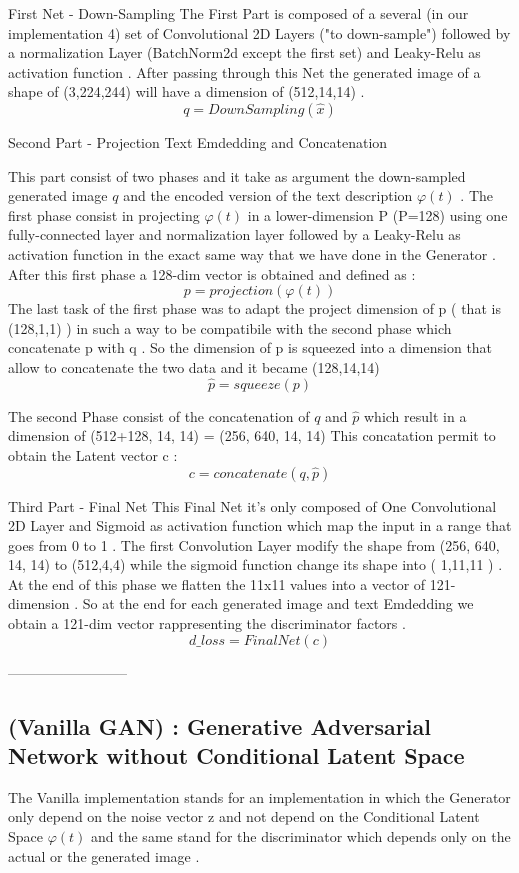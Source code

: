 First Net - Down-Sampling 
The First Part is composed of a several (in our implementation 4) set 
of Convolutional 2D Layers ("to down-sample") 
followed by a normalization Layer (BatchNorm2d except the first set)
and Leaky-Relu as activation function . 
After passing through this Net the generated image of a shape of (3,224,244)
will have a dimension of (512,14,14) .
\[
 q = DownSampling( \hat{x} )
\]

Second Part - Projection Text Emdedding and Concatenation

This part consist of two phases and it take as argument the down-sampled generated 
image ${q}$ and the encoded version of the text description $\varphi(t)$ .
The first phase consist in projecting $\varphi(t)$
in a lower-dimension P (P=128) using one fully-connected layer and normalization layer 
followed by a Leaky-Relu as activation function in the exact same way that we have done in 
the Generator .
After this first phase a 128-dim vector is obtained and defined as :
\[
 p = projection( \varphi(t) )
\]
The last task of the first phase was to adapt the project dimension of p 
( that is (128,1,1) ) in such a way to be compatibile with the second phase 
which concatenate p with q . 
So the dimension of p is squeezed into a dimension that allow to concatenate
the two data and it became (128,14,14)
\[
 \hat{p} = squeeze( p )
\]

The second Phase consist of the concatenation of $q$ and $\hat{p}$ 
which result in a dimension of (512+128, 14, 14) = (256, 640, 14, 14)
This concatation permit to obtain the Latent vector c :
\[
 c = concatenate( q , \hat{p} )
\]


Third Part - Final Net 
This Final Net it's only composed of One Convolutional 2D Layer and 
Sigmoid as activation function which map the input in a range that goes 
from 0 to 1 .
The first Convolution Layer modify the shape from (256, 640, 14, 14) 
to (512,4,4) while the sigmoid function change its shape into
( 1,11,11 ) .
At the end of this phase we flatten the 11x11 values into a vector of 
121-dimension .
So at the end for each generated image and text Emdedding we obtain a 
121-dim vector rappresenting the discriminator factors .
\[
 d\_loss = FinalNet( c )
\]

--------------------------

\subsection*{(Vanilla GAN) :  Generative Adversarial Network without Conditional Latent Space }
The Vanilla implementation stands for an implementation in which the Generator only depend 
on the noise vector z and not depend on the Conditional Latent Space $ \varphi(t) $ and the same 
stand for the discriminator which depends only on the actual or the generated image .

